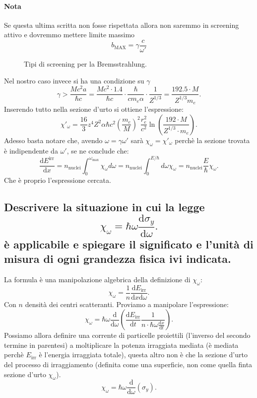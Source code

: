 \paragraph{Nota}%
Se questa ultima scritta non fosse rispettata allora non saremmo in screening attivo e dovremmo mettere limite massimo \[b_{\text{MAX}} = \gamma \frac{c}{\omega'}\]
\begin{figure}[H]
    \centering
    \caption{Tipi di screening per la Bremsstrahlung.}
    \label{fig:screening-bremsstrahlung}
\end{figure}
Nel nostro caso invece si ha una condizione su $\gamma$
\[
	\gamma > \frac{M c^2 a}{\hbar c} = \frac{M c^2 \cdot 1.4}{\hbar c}\cdot \frac{\hbar}{c m_e \alpha}\cdot \frac{1}{Z^{1 /3}} = \frac{192.5 \cdot M}{Z^{1 /3}m_e}
.\] 
Inserendo tutto nella sezione d'urto si ottiene l'espressione:
\[
	\chi'_{\omega}=\frac{16}{3}z^4Z^2\alpha\hbar c^2 \left( \frac{m_e}{M} \right)^2  \frac{r^2_e}{c^2}\ln\left( \frac{192\cdot M}{Z^{1 /3}\cdot m_e} \right) 
.\] 
Adesso basta notare che, avendo $\omega = \gamma \omega'$ sarà $\chi_{\omega}= \chi'_{\omega}$ perchè la sezione trovata è indipendente da $\omega'$, se ne conclude che:
\[
	\frac{\mbox{d} E^{\text{irr}}}{\mbox{d} x} = n_{\text{nuclei}} \int_{0}^{\omega_{\text{max}}} \chi_{\omega} d\omega = 
	n_{\text{nuclei}} \int_{0}^{E /\hbar} d\omega \chi_{\omega} 
	= n_{\text{nuclei}} \frac{E}{\hbar} \chi_{\omega}
.\] 
Che è proprio l'espressione cercata.
\subsection[]{Descrivere la situazione in cui la legge
\[
	\chi_{\omega} = \hbar \omega \frac{\text{d}\sigma_{y}}{\text{d}\omega}
.\] 
 è applicabile e spiegare il significato e l'unità di misura di ogni grandezza fisica ivi indicata.
}\label{sec:4.a.16}
La formula è una manipolazione algebrica della definizione di $\chi_{\omega}$:
\[
	\chi_{\omega}= \frac{1}{n} \frac{\mbox{d} E_{\text{irr}}}{\mbox{d} x \text{d}\omega} 
.\] 
Con $n$ densità dei centri scatteranti. Proviamo a manipolare l'espressione:
\[
	\chi_{\omega} = \hbar \omega\frac{\mbox{d}}{\mbox{d} \omega} \left( \frac{\mbox{d}E_{\text{irr}}}{\mbox{d}t}\frac{1}{n\cdot \hbar \omega \frac{\mbox{d} x}{\mbox{d} t} } \right)  
.\] 
Possiamo allora definire una corrente di particelle proiettili (l'inverso del secondo termine in parentesi) a moltiplicare la potenza irraggiata mediata (è mediata perchè $E_{\text{irr}}$ è l'energia irraggiata totale), questa altro non è che la sezione d'urto del processo di irraggiamento (definita come una superficie, non come quella finta sezione d'urto $\chi_{\omega}$).
\[
	\chi_{\omega}= \hbar \omega \frac{\mbox{d} }{\mbox{d} \omega} \left( \sigma_{y} \right) 
.\] 
